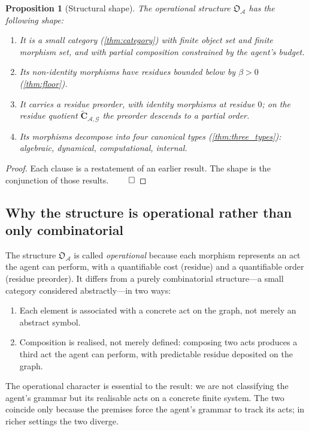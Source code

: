 \documentclass[11pt,twocolumn,a4paper]{article}
\theoremstyle{thmstyle}
\newtheorem{proposition}[theorem]{Proposition}
\theoremstyle{definition}
\theoremstyle{remark}
\newcommand{\Graph}{\mathcal{G}}
\newcommand{\Agent}{\mathcal{A}}
\newcommand{\floor}{\beta}
\newcommand{\OpStr}{\mathfrak{O}}
\begin{document}
\begin{proposition}[Structural shape]
\label{prop:shape}
The operational structure $\OpStr_\Agent$ has the following shape:
\begin{enumerate}[nosep,leftmargin=*]
\item It is a small category (\cref{thm:category}) with finite
object set and finite morphism set, and with partial composition
constrained by the agent's budget.
\item Its non-identity morphisms have residues bounded below by
$\floor > 0$ (\cref{thm:floor}).
\item It carries a residue preorder, with identity morphisms at
residue $0$; on the residue quotient
$\widetilde{\mathbf{C}}_{\Agent,\Graph}$ the preorder descends to a
partial order.
\item Its morphisms decompose into four canonical types
(\cref{thm:three_types}): algebraic, dynamical, computational,
internal.
\end{enumerate}
\end{proposition}

\begin{proof}
Each clause is a restatement of an earlier result. The shape is
the conjunction of those results. $\qed$
\end{proof}

\subsection{Why the structure is operational rather than only
combinatorial}

The structure $\OpStr_\Agent$ is called \emph{operational} because
each morphism represents an act the agent can perform, with a
quantifiable cost (residue) and a quantifiable order (residue
preorder). It differs from a purely combinatorial structure---a
small category considered abstractly---in two ways:
\begin{enumerate}[nosep,leftmargin=*]
\item Each element is associated with a concrete act on the graph,
not merely an abstract symbol.
\item Composition is realised, not merely defined: composing two
acts produces a third act the agent can perform, with predictable
residue deposited on the graph.
\end{enumerate}
The operational character is essential to the result: we are not
classifying the agent's grammar but its realisable acts on a
concrete finite system. The two coincide only because the premises
force the agent's grammar to track its acts; in richer settings
the two diverge.
\end{document}
